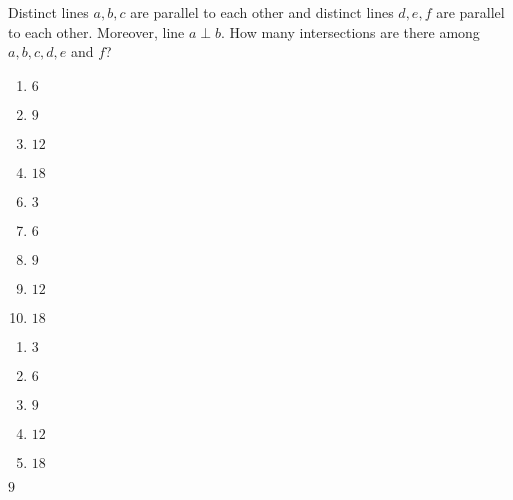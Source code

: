 





  Distinct lines $a,b,c$ are parallel to each other and distinct lines $d,e,f$ are parallel to each other.  Moreover, line $a\perp b$.  How many intersections are there
among $a,b,c,d,e$ and $f$?  


\ifsat
	\begin{enumerate}[label=\Alph*)]
		\item  $6$
		\item $9$ %
		\item $12$
		\item  $18$
	\end{enumerate}
\else
\fi

\ifacteven
	\begin{enumerate}[label=\textbf{\Alph*.},itemsep=\fill,align=left]
		\setcounter{enumii}{5}
		\item    $3$
		\item  $6$
		\item $9$ %
		\addtocounter{enumii}{1}
		\item $12$
		\item  $18$
	\end{enumerate}
\else
\fi

\ifactodd
	\begin{enumerate}[label=\textbf{\Alph*.},itemsep=\fill,align=left]
		\item    $3$
		\item  $6$
		\item $9$ %
		\item $12$
		\item  $18$
	\end{enumerate}
\else
\fi

\ifgridin
 $9$ %
		
\else
\fi

